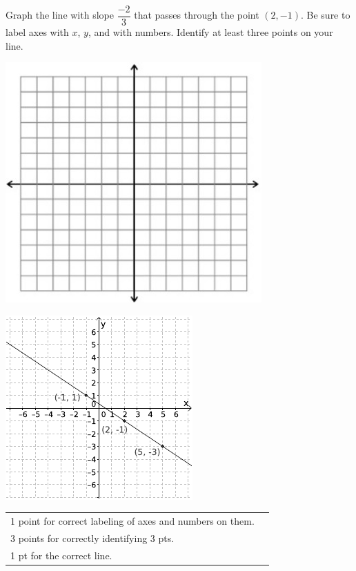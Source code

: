 {
	Graph the line with slope $\dfrac{-2}{3}$ that passes through the point $(2, -1)$. Be sure to label axes with $x$, $y$, and with numbers. Identify at least three points on your line.\begin{onlyproblem}\begin{center}\includegraphics{fig-graphpaper.png}\end{center}\end{onlyproblem} \begin{onlysolution}\begin{center}\includegraphics{fig095-08-b-answer}\end{center}\end{onlysolution}
}
{
	\begin{tabular}{l r}
	1 point for correct labeling of axes and numbers on them.\\
	3 points for correctly identifying 3 pts.\\
	1 pt for the correct line.\\
	\end{tabular}
}

